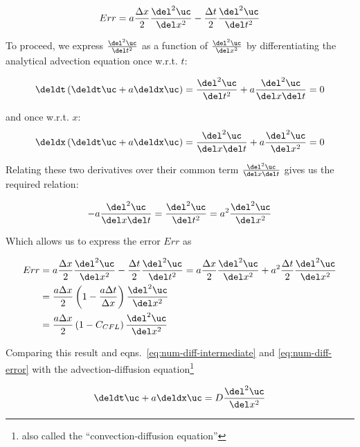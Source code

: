 \begin{align}
    Err =
    a \frac{\Delta x}{2} \frac{\del^2 \uc}{\del x^2}
    - \frac{\Delta t}{2} \frac{\del^2 \uc}{\del t^2} \label{eq:num-diff-error}
\end{align}

To proceed, we express $\frac{\del^2 \uc}{\del t^2}$ as a function of $\frac{\del^2 \uc}{\del x^2}$
by differentiating the analytical advection equation once w.r.t. $t$:

\begin{align}
    \deldt \left( \deldt \uc + a \deldx \uc \right) =
    \frac{\del^2 \uc}{\del t^2} + a \frac{\del^2 \uc}{\del x \del t} = 0
\end{align}

and once w.r.t. $x$:
\begin{align}
    \deldx \left( \deldt \uc + a \deldx \uc \right) =
    \frac{\del^2 \uc}{\del x \del t} + a \frac{\del^2 \uc}{\del x^2} = 0
\end{align}

Relating these two derivatives over their common term $\frac{\del^2 \uc}{\del x \del t}$ gives us
the required relation:

\begin{align}
  -a \frac{\del^2 \uc}{\del x \del t}  =
      \frac{\del^2 \uc}{\del t^2} = a^2 \frac{\del^2 \uc}{\del x^2}
\end{align}

Which allows us to express the error $Err$ as

\begin{align}
    Err &=
    a \frac{\Delta x}{2} \frac{\del^2 \uc}{\del x^2}
    - \frac{\Delta t}{2} \frac{\del^2 \uc}{\del t^2}
    =
    a \frac{\Delta x}{2} \frac{\del^2 \uc}{\del x^2}
    + a^2 \frac{\Delta t}{2} \frac{\del^2 \uc}{\del x^2} \\
    &= \frac{a \Delta x}{2} \left( 1 - \frac{a \Delta t}{\Delta x} \right)
        \frac{\del^2 \uc}{\del x^2} \\
    &= \frac{a \Delta x}{2} \left( 1 - C_{CFL} \right)
        \frac{\del^2 \uc}{\del x^2}
\end{align}

Comparing this result and eqns.~\ref{eq:num-diff-intermediate} and \ref{eq:num-diff-error} with the
advection-diffusion equation\footnote{also called the ``convection-diffusion equation''}

\begin{align}
    \deldt \uc + a \deldx \uc = D \frac{\del^2 \uc}{\del x^2}  \label{eq:advection-diffusion}
\end{align}

